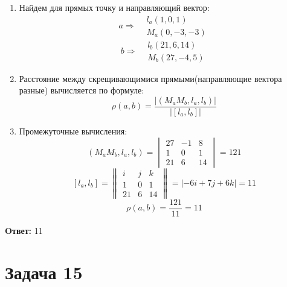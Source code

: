 \documentclass{article}
\begin{document}
\begin{enumerate}
  \item Найдем для прямых точку и направляющий вектор:
    \[
      a\Rightarrow \begin{aligned}
        &l_a(1,0,1)\\ 
        &M_a(0,-3,-3)
      \end{aligned}
    \]
    \[
      b\Rightarrow \begin{aligned}
        &l_b(21,6,14)\\ 
        &M_b(27,-4,5)
      \end{aligned}
    \]
  \item Расстояние между скрещивающимися прямыми(направляющие вектора разные) вычисляется по формуле:
    \[
      \rho(a,b) = \frac{|(M_aM_b,l_a,l_b)|}{|[l_a,l_b]|}
    \]
  \item Промежуточные вычисления:
    \[
      (M_aM_b,l_a,l_b) = \begin{vmatrix}
        27 &-1 &8\\
        1 &0 &1 \\ 
        21 &6 &14
      \end{vmatrix} = 121
    \]
    \[
      [l_a,l_b] = \begin{Vmatrix}
        i &j &k\\ 
        1 &0 &1\\ 
        21 &6 &14
      \end{Vmatrix} =| -6i +7j +6k| = 11  
    \]
    \[
      \rho(a,b) = \frac{121}{11} = 11
    \]
\end{enumerate}

\textbf{Oтвет: }11 
\section*{Задача 15}
\end{document}
